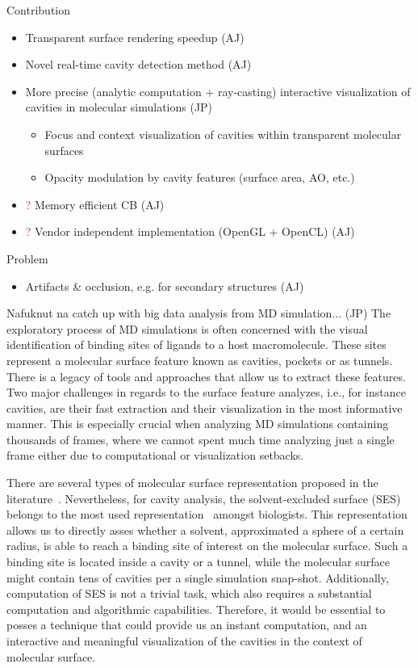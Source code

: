 Contribution
\begin{itemize}
  \item Transparent surface rendering speedup (AJ)
	\item Novel real-time cavity detection method (AJ)
	\item More precise (analytic computation + ray-casting) interactive visualization of cavities in molecular simulations (JP)
	\begin{itemize}
		\item Focus and context visualization of cavities within transparent molecular surfaces
		\item Opacity modulation by cavity features (surface area, AO, etc.)
	\end{itemize}
	\item \textcolor{red}{?} Memory efficient CB (AJ)
	\item \textcolor{red}{?} Vendor independent implementation (OpenGL + OpenCL) (AJ)
\end{itemize}

Problem
\begin{itemize}
  \item Artifacts \& occlusion, e.g. for secondary structures (AJ)
\end{itemize}

Nafuknut na catch up with big data analysis from MD simulation... (JP)
The exploratory process of MD simulations is often concerned with the visual identification of binding sites of ligands to a host macromolecule.
These sites represent a molecular surface feature known as cavities, pockets or as tunnels.
There is a legacy of tools and approaches that allow us to extract these features.
Two major challenges in regards to the surface feature analyzes, i.e., for instance cavities, are their fast extraction and their visualization in the most informative manner. This is especially crucial when analyzing MD simulations containing thousands of frames, where we cannot spent much time analyzing just a single frame either due to computational or visualization setbacks. 

There are several types of molecular surface representation proposed in the literature~\cite{START2015}. Nevertheless, for cavity analysis,  the solvent-excluded surface (SES) belongs to the most used representation~\cite{todo} amongst biologists. This representation allows us to directly asses whether a solvent, approximated a sphere of a certain radius, is able to reach a binding site of interest on the molecular surface. Such a binding site is located inside a cavity or a tunnel, while the molecular surface might contain tens of cavities per a single simulation snap-shot. Additionally, computation of SES is not a trivial task, which also requires a substantial computation and algorithmic capabilities. Therefore, it would be essential to posses a technique that could provide us an instant computation, and an interactive and meaningful visualization of the cavities in the context of molecular surface.


